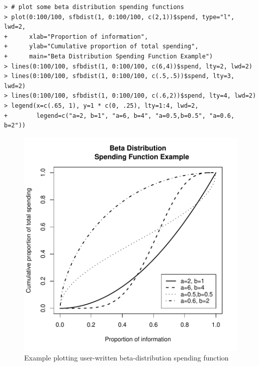 \begin{verbatim}
> # plot some beta distribution spending functions
> plot(0:100/100, sfbdist(1, 0:100/100, c(2,1))$spend, type="l", lwd=2,
+      xlab="Proportion of information",
+      ylab="Cumulative proportion of total spending",
+      main="Beta Distribution Spending Function Example")
> lines(0:100/100, sfbdist(1, 0:100/100, c(6,4))$spend, lty=2, lwd=2)
> lines(0:100/100, sfbdist(1, 0:100/100, c(.5,.5))$spend, lty=3, lwd=2)
> lines(0:100/100, sfbdist(1, 0:100/100, c(.6,2))$spend, lty=4, lwd=2)
> legend(x=c(.65, 1), y=1 * c(0, .25), lty=1:4, lwd=2,
+        legend=c("a=2, b=1", "a=6, b=4", "a=0.5,b=0.5", "a=0.6, b=2"))
\end{verbatim}
\begin{center}%
\begin{figure}
\begin{center}
\includegraphics[width=.6\textwidth]{figs/sfbdist.pdf}
\end{center}
\caption{Example plotting user-written beta-distribution spending function}
\end{figure}%

\end{center}

